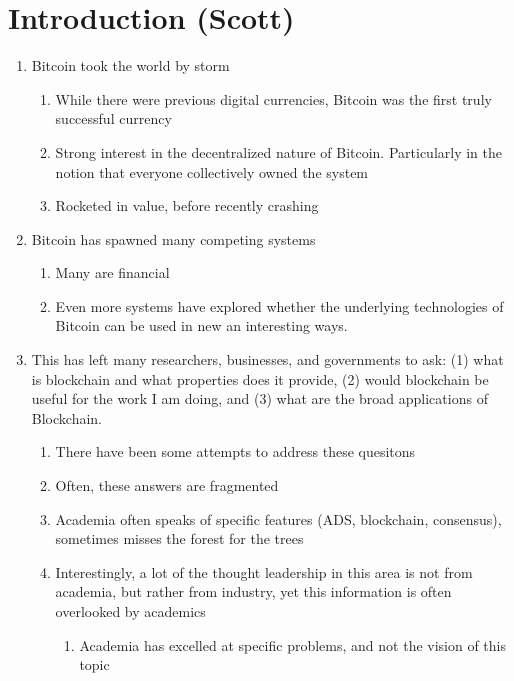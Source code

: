 
\section{Introduction (Scott)}

\begin{enumerate}

	\item Bitcoin took the world by storm
	\begin{enumerate}
	\item While there were previous digital currencies, Bitcoin was the first truly successful currency
	\item Strong interest in the decentralized nature of Bitcoin. Particularly in the notion that everyone collectively owned the system
	\item Rocketed in value, before recently crashing
	\end{enumerate}

	\item Bitcoin has spawned many competing systems
	\begin{enumerate}
	\item Many are financial
	\item Even more systems have explored whether the underlying technologies of Bitcoin can be used in new an interesting ways.
	\end{enumerate}

	\item This has left many researchers, businesses, and governments to ask: (1) what is blockchain and what properties does it provide, (2) would blockchain be useful for the work I am doing, and (3) what are the broad applications of Blockchain.
	\begin{enumerate}
		\item There have been some attempts to address these quesitons
		\item Often, these answers are fragmented
		\item Academia often speaks of specific features (ADS, blockchain, consensus), sometimes misses the forest for the trees
		\item Interestingly, a lot of the thought leadership in this area is not from academia, but rather from industry, yet this information is often overlooked by academics
		\begin{enumerate}
			\item Academia has excelled at specific problems, and not the vision of this topic
		\end{enumerate}
	\end{enumerate}


\end{enumerate}
